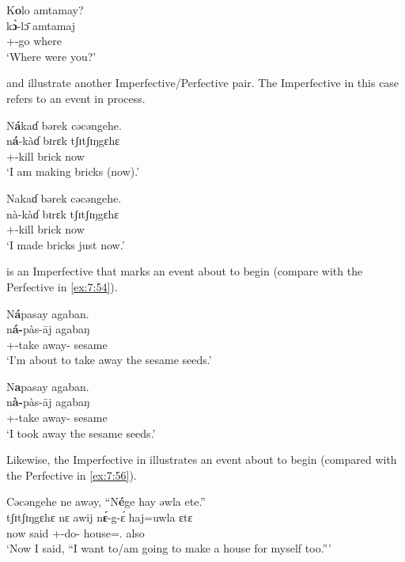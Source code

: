 \clearpage
\ea\label{ex:7:50}
K\textbf{o}lo  amtamay?\\
\gll k\textbf{\`ɔ}{}-l\=ɔ  amtamaj\\
{\twoS}+{\PFV}-go  where\\
\glt ‘Where were you?’
\z

 and  illustrate another Imperfective/Perfective pair. The Imperfective in this case refers to an event in process. 

\ea\label{ex:7:51}
N\textbf{á}kaɗ  bərek  cəcəngehe.\\
\gll n\textbf{á}-kàɗ  bɪrɛk  tʃɪtʃɪŋgɛhɛ\\
{\oneS}+{\IFV}-kill  brick  now\\
\glt ‘I am making bricks (now).’ 
\z

\ea\label{ex:7:52}
Nakaɗ  bərek  cəcəngehe.\\
\gll nà-kàɗ  bɪrɛk  tʃɪtʃɪŋgɛhɛ\\
{\oneS}+{\PFV}-kill  brick  now\\
\glt ‘I made bricks just now.’ 
\z

 is an Imperfective that marks an event about to begin (compare with the Perfective in \ref{ex:7:54}). 

\ea\label{ex:7:53} 
N\textbf{á}pasay  agaban.  \\
\gll n\textbf{á-}pàs-\={a}j agabaŋ  \\
{{\oneS}+{\IFV}-take away-{\CL}}  sesame\\
\glt ‘I’m about to take away the sesame seeds.’
\z

\ea\label{ex:7:54}
N\textbf{a}pasay agaban. \\ 
\gll n\textbf{à-}pàs-\={a}j  agabaŋ \\ 
{{\oneS}+{\PFV}-take away-{\CL}}  sesame\\
\glt ‘I took away the sesame seeds.’
\z

Likewise, the Imperfective in  illustrates an event about to begin (compared with the Perfective in \ref{ex:7:56}).

\ea\label{ex:7:55}
Cəcəngehe  ne awəy,  “N\textbf{é}ge  hay  əwla  ete.”\\
\gll tʃɪtʃɪŋgɛhɛ   nɛ  awij    n\textbf{\'ɛ}{}-g-\'ɛ     haj=uwla     ɛtɛ\\
now    {\oneS}  said    {\oneS}+{\IFV}-do-{\CL}  house={\oneS}.{\POSS}  also\\
\glt ‘Now I said, “I want to/am going to make a house for myself too.”’
\z


